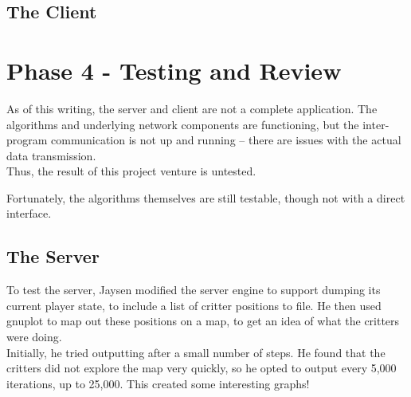 \subsection{The Client}

\section{Phase 4 - Testing and Review}
As of this writing, the server and client are not a complete application. The
algorithms and underlying network components are functioning, but the
inter-program communication is not up and running -- there are issues with the
actual data transmission. \\
Thus, the result of this project venture is untested.

Fortunately, the algorithms themselves are still testable, though not with a
direct interface.

\subsection{The Server}
To test the server, Jaysen modified the server engine to support dumping its
current player state, to include a list of critter positions to file. He then
used gnuplot to map out these positions on a map, to get an idea of what the
critters were doing. \\
Initially, he tried outputting after a small number of steps. He found that the
critters did not explore the map very quickly, so he opted to output every 5,000
iterations, up to 25,000. This created some interesting graphs!

